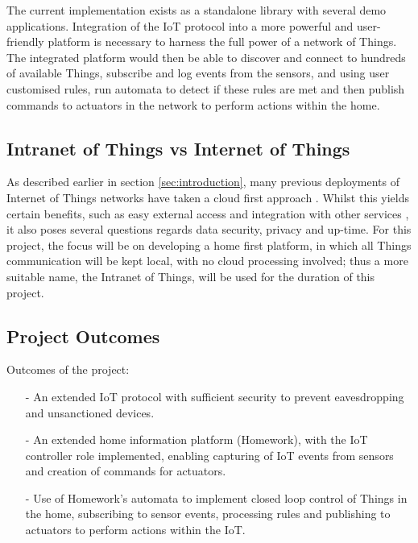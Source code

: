\documentclass{mprop}
\begin{document}
The current implementation exists as a standalone library with several demo applications. Integration of the IoT protocol into a more powerful and user-friendly platform is necessary to harness the full power of a network of Things. The integrated platform would then be able to discover and connect to hundreds of available Things, subscribe and log events from the sensors, and using user customised rules, run automata to detect if these rules are met and then publish commands to actuators in the network to perform actions within the home.

\subsection{Intranet of Things vs Internet of Things} %
\label{sub:intranet_of_things}

As described earlier in section \ref{sec:introduction}, many previous deployments of Internet of Things networks have taken a cloud first approach \cite{SmartThings, Twine}. Whilst this yields certain benefits, such as easy external access and integration with other services \cite{IFTTT, Xively}, it also poses several questions regards data security, privacy and up-time. For this project, the focus will be on developing a home first platform, in which all Things communication will be kept local, with no cloud processing involved; thus a more suitable name, the Intranet of Things, will be used for the duration of this project. 

\subsection{Project Outcomes} %
\label{sub:project_outcomes}

Outcomes of the project:
\begin{itemize}
  \item[-] An extended IoT protocol with sufficient security to prevent eavesdropping and unsanctioned devices.
  \item[-] An extended home information platform (Homework), with the IoT controller role implemented, enabling capturing of IoT events from sensors and creation of commands for actuators.
  \item[-] Use of Homework's automata to implement closed loop control of Things in the home, subscribing to sensor events, processing rules and publishing to actuators to perform actions within the IoT.
\end{itemize}
\end{document}
